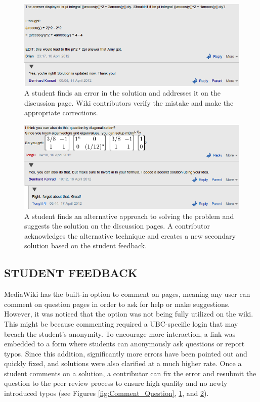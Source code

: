 \documentclass{primus}
\begin{document}
\begin{figure}[H]
\centering
\includegraphics[width=\textwidth]{figs/Comment_Error.png}
\caption{A student finds an error in the solution and addresses it on the discussion page. Wiki contributors verify the mistake and make the appropriate corrections.}\label{fig:Comment_Error}
\end{figure}
\begin{figure}[H]
\centering
\includegraphics[width=\textwidth]{figs/Comment_Suggestion.png}
\caption{A student finds an alternative approach to solving the problem and suggests the solution on the discussion pages. A contributor acknowledges the alternative technique and creates a new secondary solution based on the student feedback.}\label{fig:Comment_Suggestion}
\end{figure}

\subsection{STUDENT FEEDBACK}\label{sec:Student_Feedback}
MediaWiki has the built-in option to comment on pages, meaning any user can comment on question pages in order to ask for help or make suggestions. However, it was noticed that the option was not being fully utilized on the wiki. This might be because commenting required a UBC-specific login that may breach the student’s anonymity. To encourage more interaction, a link was embedded to a form where students can anonymously ask questions or report typos. Since this addition, significantly more errors have been pointed out and quickly fixed, and solutions were also clarified at a much higher rate. Once a student comments on a solution, a contributor can fix the error and resubmit the question to the peer review process to ensure high quality and no newly introduced typos (see Figures \ref{fig:Comment_Question}, \ref{fig:Comment_Error}, and \ref{fig:Comment_Suggestion}).
\end{document}
